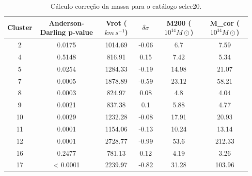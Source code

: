 {\scriptsize
\begin{longtable}{cccccc}
\caption{Cálculo correção da massa para o catálogo selec20.}
\label{tab:massselec20}
\\ \hline
\textbf{Cluster} & \textbf{Anderson-Darling p-value} & \textbf{Vrot ($km \, s^{-1}$)} & \textbf{$\delta \sigma$} & \textbf{M200 ($10^{14}  M\odot$)} & \textbf{M_{cor} ($10^{14}  M\odot$)} \\ \hline
2 & {\color{red}0.0175} & 1014.69 & -0.06 & 6.7 & 7.59 \\
4 & 0.5148 & 816.91 & 0.15 & 7.42 & 5.34 \\
5 & {\color{red}0.0254} & 1284.33 & -0.19 & 14.98 & 21.07 \\
7 & {\color{red}0.0005} & 1878.89 & -0.59 & 23.12 & 58.21 \\
8 & {\color{red}0.0003} & 824.97 & 0.08 & 4.8 & 4.04 \\
9 & {\color{red}0.0021} & 837.38 & 0.1 & 5.88 & 4.77 \\
10 & {\color{red}0.0029} & 1232.28 & -0.08 & 17.91 & 20.93 \\
11 & {\color{red}0.0001} & 1154.06 & -0.13 & 10.24 & 13.14 \\
12 & {\color{red}0.0001} & 2728.77 & -0.99 & 53.6 & 212.33 \\
16 & 0.2477 & 781.13 & 0.12 & 4.19 & 3.26 \\
17 & {\color{red}< 0.0001} & 2239.97 & -0.82 & 31.28 & 103.96 \\ \hline
\end{longtable}
}

